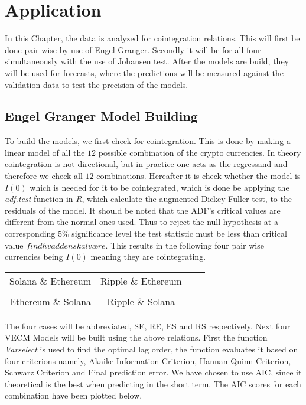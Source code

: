 \chapter{Application}
In this Chapter, the data is analyzed for cointegration relations. This will first be done pair wise by use of Engel Granger. Secondly it will be for all four simultaneously with the use of Johansen test. After the models are build, they will be used for forecasts, where the predictions will be measured against the validation data to test the precision of the models.


\section{Engel Granger Model Building}
To build the models, we first check for cointegration. This is done by making a linear model of all the $12$ possible combination of the crypto currencies. In theory cointegration is not directional, but in practice one acts as the regressand and therefore we check all $12$ combinations. Hereafter it is check whether the model is $I(0)$ which is needed for it to be cointegrated, which is done be applying the \textit{adf.test} function in \textit{R}, which calculate the augmented Dickey Fuller test, to the residuals of the model. It should be noted that the ADF's critical values are different from the normal ones used. Thus to reject the null hypothesis at a corresponding $5\%$ significance level the test statistic must be less than critical value $find hvad den skal være$. This results in the following four pair wise currencies being $I(0)$ meaning they are cointegrating. 
\pause
\begin{center}
\begin{tabular}{cccc}
   Solana \& Ethereum \quad & \quad Ripple \& Ethereum\\\\
   Ethereum \& Solana \quad & \quad Ripple \& Solana
\end{tabular}
\end{center}
\pause
\noindent The four cases will be abbreviated, SE, RE, ES and RS respectively. Next four VECM Models will be built using the above relations. First the function \textit{Varselect} is used to find the optimal lag order, the function evaluates it based on four criterions namely, Akaike Information Criterion, Hannan Quinn Criterion, Schwarz Criterion and Final prediction error. We have chosen to use AIC, since it theoretical is the best when predicting in the short term. The AIC scores for each combination have been plotted below.

